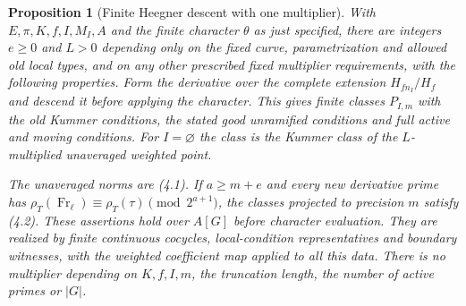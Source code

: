 \documentclass[11pt]{article}
\newtheorem{proposition}[theorem]{Proposition}
\theoremstyle{definition}
\theoremstyle{remark}
\begin{document}
\begin{proposition}[Finite Heegner descent with one multiplier]\label{ex:arith-finite-heegner}
With $E,\pi,K,f,I,M_I,A$ and the finite character $\theta$ as just
specified, there are integers $e\geq0$ and $L>0$ depending only
on the fixed curve, parametrization and allowed old local types,
and on any other prescribed fixed multiplier requirements, with
the following properties. Form the derivative over the complete
extension $H_{fn_I}/H_f$ and descend it before applying the character.
This gives finite classes $P_{I,m}$ with the old Kummer conditions,
the stated good unramified conditions and full active and moving
conditions. For $I=\varnothing$ the class is the Kummer class of
the $L$-multiplied unaveraged weighted point.

The unaveraged norms are (4.1). If $a\geq m+e$ and every new
derivative prime has $\rho_T(\operatorname{Fr}_\ell)\equiv
\rho_T(\tau)\pmod{2^{a+1}}$, the classes projected to precision
$m$ satisfy (4.2). These assertions hold over $A[G]$ before
character evaluation. They are realized by finite continuous
cocycles, local-condition representatives and boundary witnesses,
with the weighted coefficient map applied to all this data.
There is no multiplier depending on $K,f,I,m$, the truncation
length, the number of active primes or $|G|$.
\end{proposition}
\end{document}

